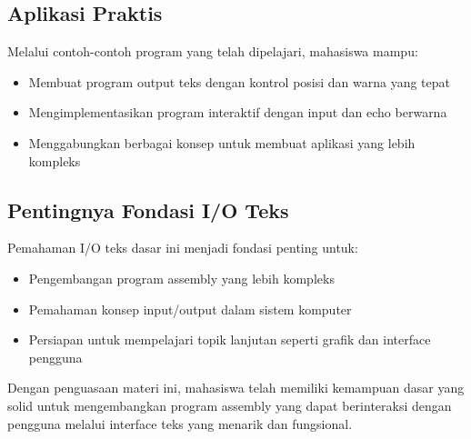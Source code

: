 \documentclass[../main.tex]{subfiles}
\begin{document}
        \subsection{Aplikasi Praktis}
            Melalui contoh-contoh program yang telah dipelajari, mahasiswa mampu:
            \begin{itemize}
                \item Membuat program output teks dengan kontrol posisi dan warna yang tepat
                \item Mengimplementasikan program interaktif dengan input dan echo berwarna
                \item Menggabungkan berbagai konsep untuk membuat aplikasi yang lebih kompleks
            \end{itemize}

        \subsection{Pentingnya Fondasi I/O Teks}
            Pemahaman I/O teks dasar ini menjadi fondasi penting untuk:
            \begin{itemize}
                \item Pengembangan program assembly yang lebih kompleks
                \item Pemahaman konsep input/output dalam sistem komputer
                \item Persiapan untuk mempelajari topik lanjutan seperti grafik dan interface pengguna
            \end{itemize}

        Dengan penguasaan materi ini, mahasiswa telah memiliki kemampuan dasar yang solid untuk mengembangkan program assembly yang dapat berinteraksi dengan pengguna melalui interface teks yang menarik dan fungsional.

    
\end{document}
